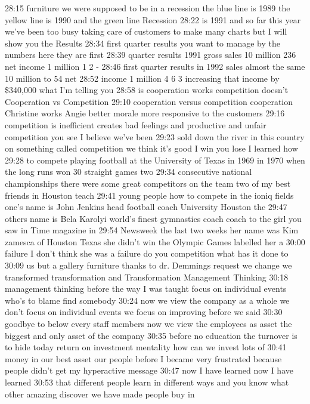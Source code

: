 \documentclass[
]{book}
\begin{document}
28:15
furniture we were supposed to be in a recession the blue line is 1989 the yellow line is 1990 and the green line
Recession
28:22
is 1991 and so far this year we've been too busy taking care of customers to make many charts but I will show you the
Results
28:34
first quarter results you want to manage by the numbers here they are first
28:39
quarter results 1991 gross sales 10 million 236 net income 1 million 1 2 -
28:46
first quarter results in 1992 sales almost the same 10 million to 54 net
28:52
income 1 million 4 6 3 increasing that income by \$340,000 what I'm telling you
28:58
is cooperation works competition doesn't
Cooperation vs Competition
29:10
cooperation versus competition cooperation Christine works Angie better morale more responsive to the customers
29:16
competition is inefficient creates bad feelings and productive and unfair competition you see I believe we've been
29:23
sold down the river in this country on something called competition we think it's good I win you lose I learned how
29:28
to compete playing football at the University of Texas in 1969 in 1970 when the long runs won 30 straight games two
29:34
consecutive national championships there were some great competitors on the team two of my best friends in Houston teach
29:41
young people how to compete in the ioniq fields one's name is John Jenkins head football coach University Houston the
29:47
others name is Bela Karolyi world's finest gymnastics coach coach to the girl you saw in Time magazine in
29:54
Newsweek the last two weeks her name was Kim zamesca of Houston Texas she didn't win the Olympic Games labelled her a
30:00
failure I don't think she was a failure do you competition what has it done to
30:09
us but a gallery furniture thanks to dr. Demmings request we change we transformed transformation and
Transformation Management Thinking
30:18
management thinking before the way I was taught focus on individual events who's to blame find somebody
30:24
now we view the company as a whole we don't focus on individual events we focus on improving before we said
30:30
goodbye to below every staff members now we view the employees as asset the biggest and only asset of the company
30:35
before no education the turnover is to hide today return on investment mentality how can we invest lots of
30:41
money in our best asset our people before I became very frustrated because people didn't get my hyperactive message
30:47
now I have learned now I have learned
30:53
that different people learn in different ways and you know what other amazing discover we have made people buy in
\end{document}
